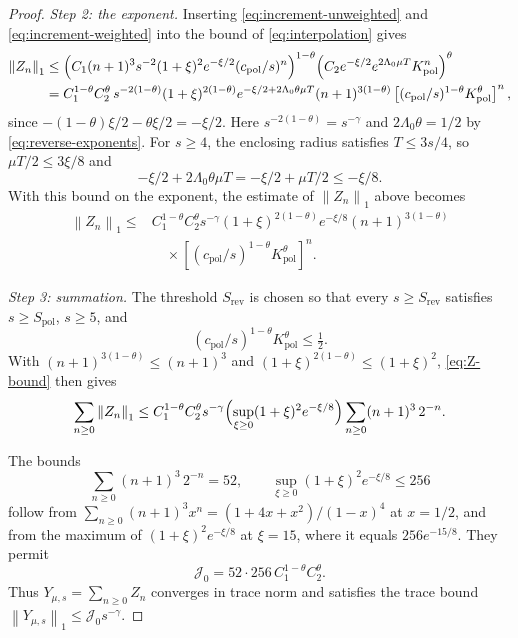 \documentclass[11pt]{amsart}
\numberwithin{equation}{section}
\theoremstyle{definition}
\newcommand{\norm}[1]{\left\|#1\right\|}
\begin{document}
\begin{proof}
\smallskip
\emph{Step 2: the exponent.} Inserting
\eqref{eq:increment-unweighted} and \eqref{eq:increment-weighted} into
the bound of \eqref{eq:interpolation} gives
\begin{align*}
 \norm{Z_n}_1
 &\le\Bigl(C_1(n+1)^3s^{-2}(1+\xi)^2e^{-\xi/2}
   (c_{\mathrm{pol}}/s)^n\Bigr)^{1-\theta}
   \Bigl(C_2e^{-\xi/2}e^{2\Lambda_0\mu T}K_{\mathrm{pol}}^n\Bigr)^{\theta}\\
 &=C_1^{1-\theta}C_2^\theta\,s^{-2(1-\theta)}(1+\xi)^{2(1-\theta)}
   e^{-\xi/2+2\Lambda_0\theta\mu T}(n+1)^{3(1-\theta)}
   \left[(c_{\mathrm{pol}}/s)^{1-\theta}K_{\mathrm{pol}}^\theta\right]^n,
\end{align*}
since \(-(1-\theta)\xi/2-\theta\xi/2=-\xi/2\). Here
\(s^{-2(1-\theta)}=s^{-\gamma}\) and \(2\Lambda_0\theta=1/2\) by
\eqref{eq:reverse-exponents}. For \(s\ge4\), the enclosing radius
satisfies \(T\le3s/4\), so \(\mu T/2\le3\xi/8\) and
\[
 -\xi/2+2\Lambda_0\theta\mu T
 =-\xi/2+\mu T/2\le-\xi/8.
\]
With this bound on the exponent,
the estimate of \(\norm{Z_n}_1\) above becomes
\begin{equation}
 \begin{split}
 \norm{Z_n}_1\le{}&
 C_1^{1-\theta}C_2^\theta
 s^{-\gamma}(1+\xi)^{2(1-\theta)}e^{-\xi/8}
 (n+1)^{3(1-\theta)}\\
 &\quad{}\times
 \left[(c_{\mathrm{pol}}/s)^{1-\theta}K_{\mathrm{pol}}^\theta\right]^n.
 \end{split}
 \label{eq:Z-bound}
\end{equation}

\smallskip
\emph{Step 3: summation.} The threshold \(S_{\mathrm{rev}}\) is chosen
so that every \(s\ge S_{\mathrm{rev}}\) satisfies \(s\ge S_{\mathrm{pol}}\),
\(s\ge5\), and
\[
 (c_{\mathrm{pol}}/s)^{1-\theta}K_{\mathrm{pol}}^\theta\le\tfrac12.
\]
With \((n+1)^{3(1-\theta)}\le(n+1)^3\) and
\((1+\xi)^{2(1-\theta)}\le(1+\xi)^2\), \eqref{eq:Z-bound} then gives
\[
 \sum_{n\ge0}\norm{Z_n}_1
 \le C_1^{1-\theta}C_2^\theta s^{-\gamma}
 \Bigl(\sup_{\xi\ge0}(1+\xi)^2e^{-\xi/8}\Bigr)
 \sum_{n\ge0}(n+1)^3\,2^{-n}.
\]

The bounds
\[
 \sum_{n\ge0}(n+1)^3\,2^{-n}=52,\qquad
 \sup_{\xi\ge0}(1+\xi)^2e^{-\xi/8}\le256
\]
follow from \(\sum_{n\ge0}(n+1)^3x^n=(1+4x+x^2)/(1-x)^4\) at
\(x=1/2\), and from the maximum of \((1+\xi)^2e^{-\xi/8}\) at
\(\xi=15\), where it equals \(256e^{-15/8}\). They permit
\begin{equation}
 \mathcal J_0=52\cdot256\,C_1^{1-\theta}C_2^\theta.
 \label{eq:J0}
\end{equation}
Thus \(Y_{\mu,s}=\sum_{n\ge0}Z_n\) converges in trace norm and
satisfies the trace bound
\(\norm{Y_{\mu,s}}_1\le\mathcal J_0s^{-\gamma}\).


\end{proof}
\end{document}
